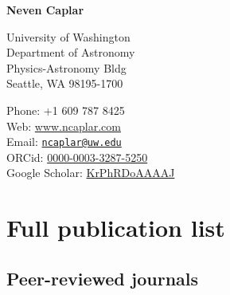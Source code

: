\documentclass[11pt,letterpaper]{article}
\def\name{\textbf{Neven Caplar}}
\begin{document}
{\huge \name}


\bigskip

\begin{minipage}[t]{0.645\textwidth}
  University of Washington\\
  Department of Astronomy \\
  Physics-Astronomy Bldg	 \\
  Seattle, WA 98195-1700
\end{minipage}
\begin{minipage}[t]{0.345\textwidth}
  Phone: +1 609 787 8425 \\
  Web: \href{ www.ncaplar.com}{www.ncaplar.com} \\
  Email: \href{ncaplar@uw.edu}{\nolinkurl{ncaplar@uw.edu}} \\
  ORCid: \href{https://orcid.org/0000-0003-3287-5250}{0000-0003-3287-5250} \\
  Google Scholar:  \href{https://scholar.google.com/citations?hl=en&user=KrPhRDoAAAAJ}{KrPhRDoAAAAJ} 
\end{minipage}




\section*{Full publication list}


\subsection*{Peer-reviewed journals}
\end{document}
